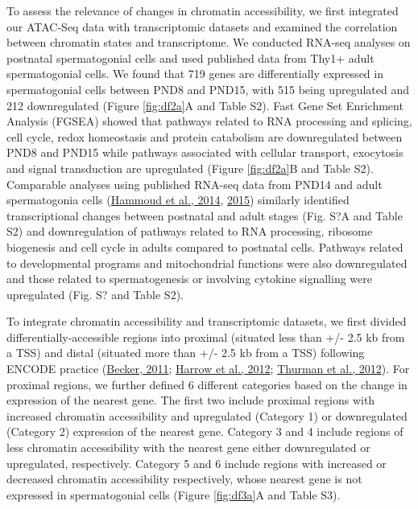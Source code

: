 \documentclass[12pt,twoside]{reedthesis}
\begin{document}
To assess the relevance of changes in chromatin accessibility, we first
integrated our ATAC-Seq data with transcriptomic datasets and examined
the correlation between chromatin states and transcriptome. We conducted
RNA-seq analyses on postnatal spermatogonial cells and used published
data from Thy1+ adult spermatogonial cells. We found that 719 genes are
differentially expressed in spermatogonial cells between PND8 and PND15,
with 515 being upregulated and 212 downregulated (Figure \ref{fig:df2a}A and Table S2).
Fast Gene Set Enrichment Analysis (FGSEA) showed that pathways related
to RNA processing and splicing, cell cycle, redox homeostasis and
protein catabolism are downregulated between PND8 and PND15 while
pathways associated with cellular transport, exocytosis and signal
transduction are upregulated (Figure \ref{fig:df2a}B and Table S2). Comparable analyses
using published RNA-seq data from PND14 and adult spermatogonia cells
(\protect\hyperlink{ref-hammoud2014}{Hammoud et al., 2014}, \protect\hyperlink{ref-hammoud2015}{2015}) similarly identified transcriptional
changes between postnatal and adult stages (Fig. S?A and Table S2) and
downregulation of pathways related to RNA processing, ribosome
biogenesis and cell cycle in adults compared to postnatal cells.
Pathways related to developmental programs and mitochondrial functions
were also downregulated and those related to spermatogenesis or
involving cytokine signalling were upregulated (Fig. S? and Table S2).

To integrate chromatin accessibility and transcriptomic datasets, we
first divided differentially-accessible regions into proximal (situated
less than +/- 2.5 kb from a TSS) and distal (situated more than +/- 2.5
kb from a TSS) following ENCODE practice (\protect\hyperlink{ref-ausers2011}{Becker, 2011}; \protect\hyperlink{ref-harrow2012}{Harrow et al., 2012}; \protect\hyperlink{ref-thurman2012}{Thurman et al., 2012}). For proximal regions, we further defined 6 different
categories based on the change in expression of the nearest gene. The
first two include proximal regions with increased chromatin
accessibility and upregulated (Category 1) or downregulated (Category 2)
expression of the nearest gene. Category 3 and 4 include regions of less
chromatin accessibility with the nearest gene either downregulated or
upregulated, respectively. Category 5 and 6 include regions with
increased or decreased chromatin accessibility respectively, whose
nearest gene is not expressed in spermatogonial cells (Figure \ref{fig:df3a}A and Table
S3).
\end{document}
